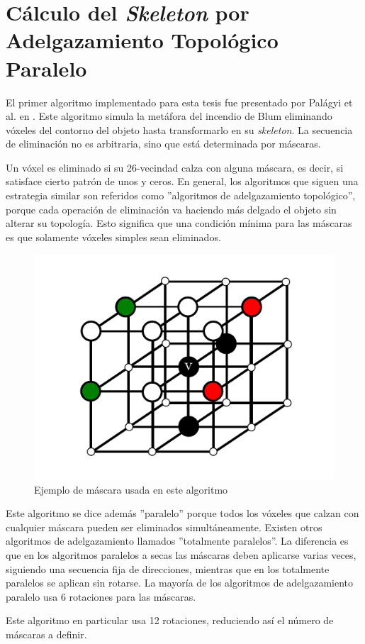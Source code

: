 \chapter{Cálculo del \textit{Skeleton} por Adelgazamiento Topológico Paralelo}
\label{ch:palagyi}

El primer algoritmo implementado para esta tesis fue presentado por Palágyi et al. en \cite{palagyi1999parallel}. Este algoritmo simula la metáfora del incendio de Blum eliminando vóxeles del contorno del objeto hasta transformarlo en su \textit{skeleton}. La secuencia de eliminación no es arbitraria, sino que está determinada por máscaras.

Un vóxel es eliminado si su 26-vecindad calza con alguna máscara, es decir, si satisface cierto patrón de unos y ceros. En general, los algoritmos que siguen una estrategia similar son referidos como ''algoritmos de adelgazamiento topológico'', porque cada operación de eliminación va haciendo más delgado el objeto sin alterar su topología. Esto significa que una condición mínima para las máscaras es que solamente vóxeles simples sean eliminados.

\begin{figure}[H]\centering
\includegraphics[width=0.5\linewidth]{images/palagyi_mask}
\caption{Ejemplo de máscara usada en este algoritmo}
\label{fig:palagyi_mask}
\end{figure}

Este algoritmo se dice además ''paralelo'' porque todos los vóxeles que calzan con cualquier máscara pueden ser eliminados simultáneamente. Existen otros algoritmos de adelgazamiento llamados ''totalmente paralelos''. La diferencia es que en los algoritmos paralelos a secas las máscaras deben aplicarse varias veces, siguiendo una secuencia fija de direcciones, mientras que en los totalmente paralelos se aplican sin rotarse. La mayoría de los algoritmos de adelgazamiento paralelo usa 6 rotaciones para las máscaras.

Este algoritmo en particular usa 12 rotaciones, reduciendo así el número de máscaras a definir.

